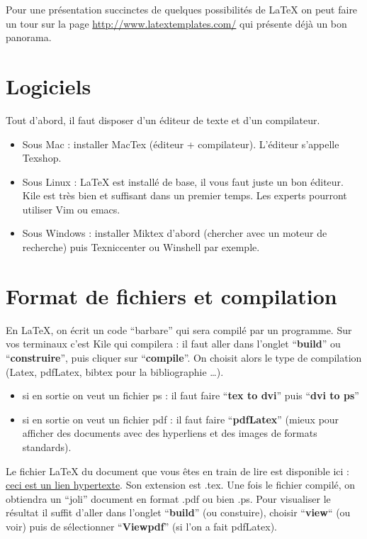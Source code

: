 Pour une présentation succinctes de quelques possibilités de \LaTeX{}
on peut faire un tour sur la page  \url{http://www.latextemplates.com/}
qui présente déjà un bon panorama.


\section{Logiciels}

Tout d'abord, il faut disposer d'un éditeur de texte et d'un compilateur.

\begin{itemize}
\item Sous Mac : installer MacTex  (éditeur + compilateur). L'éditeur s'appelle Texshop.  
\item Sous Linux : \LaTeX{} est installé de base, il vous faut juste un bon éditeur. Kile est très bien et suffisant
dans un premier temps. Les experts pourront utiliser Vim ou emacs. 
\item Sous Windows : installer Miktex d'abord (chercher avec un moteur de recherche) puis Texniccenter 
ou  Winshell par exemple.
\end{itemize}


\section{Format de fichiers et compilation}
En \LaTeX{}, on écrit un code ``barbare'' qui sera compil\'e par un programme. Sur vos terminaux c'est Kile 
qui compilera : il faut aller dans l'onglet ``\textbf{build}'' ou ``\textbf{construire}'', puis cliquer 
sur ``\textbf{compile}''. On choisit alors le type de compilation (Latex, pdfLatex, bibtex pour la
 bibliographie \ldots). 
\begin{itemize}
 \item si en sortie on veut un fichier ps : il faut faire ``\textbf{tex to dvi}'' puis  ``\textbf{dvi to ps}''
 \item si en sortie on veut un fichier pdf : il faut faire ``\textbf{pdfLatex}'' (mieux pour afficher des documents 
avec des hyperliens et des images de formats standards).
\end{itemize}



Le fichier \LaTeX{} du document que vous êtes en train de lire est  disponible ici : 
\href{http://josephsalmon.eu/enseignement/M1/introlatex.tex}{ceci est un lien hypertexte}.  
Son extension est  .tex. Une fois le fichier compilé,  on obtiendra un ``joli'' document en format .pdf 
ou bien .ps. Pour visualiser le résultat il suffit d'aller dans l'onglet  ``\textbf{build}'' 
(ou constuire), choisir ``\textbf{view}`` (ou voir) puis de sélectionner ``\textbf{Viewpdf}'' 
(si l'on a fait pdfLatex).\medskip

